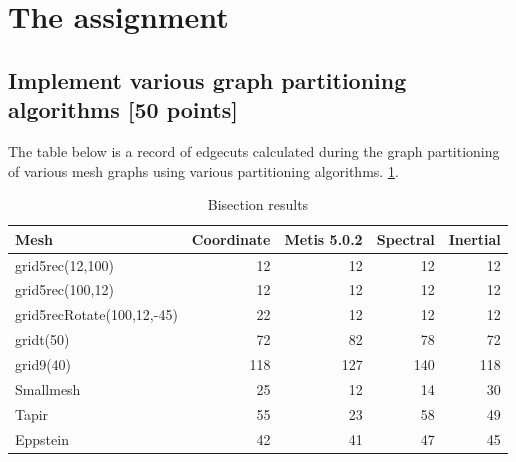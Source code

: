 \documentclass[unicode,11pt,a4paper,oneside,numbers=endperiod,openany]{scrartcl}
\begin{document}
\setassignment
{}

\newline

\assignmentpolicy

\newpage

\section{The assignment}

\subsection{Implement various graph partitioning algorithms [50 points]}
The table below is a record of edgecuts calculated during the graph partitioning of various mesh graphs using various partitioning algorithms. \ref{table:bisection}.


\begin{table}[h]
\caption{Bisection results}
\centering
\begin{tabular}{l|r|r|r|r} \hline\hline 
Mesh             &  Coordinate           & Metis 5.0.2  & Spectral & Inertial  \\ \hline
grid5rec(12,100)&   12                   &      12       &     12     &       12    \\             
grid5rec(100,12)&   12                   &       12      &     12     &       12    \\ 
grid5recRotate(100,12,-45)&        22      &      12       &    12      &      12     \\ 
gridt(50)        &            72            &      82       &     78     &     72      \\ 
grid9(40)        &              118          &      127       &      140    &  118         \\ 
Smallmesh            &             25           &      12       &      14    &     30      \\ 
Tapir            &                55        &    23         &    58      &     49      \\ 
Eppstein            &              42          &       41      &    47      &   45        \\  
\hline \hline
\end{tabular}
\label{table:bisection}
\end{table}
\end{document}
